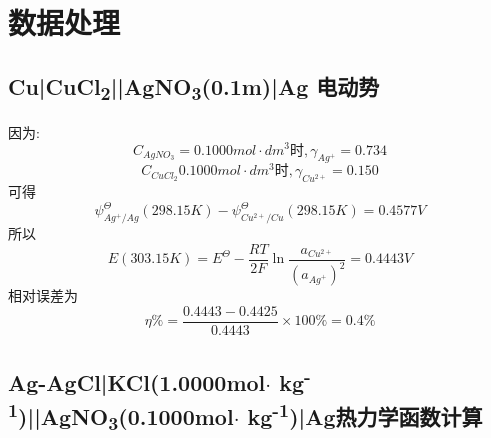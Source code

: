 \documentclass[11pt]{report}
\begin{document}
\chapter{数据处理}
\label{sec:org2010753}
\section{Cu|CuCl\textsubscript{2}||AgNO\textsubscript{3}(0.1m)|Ag 电动势}
\label{sec:org9f7a7e3}
因为:
\[
C_{AgNO_{3}}=0.1000mol\cdot dm^{3}时, \gamma_{Ag^{+}}=0.734
\]
\[
C_{CuCl_{2}}0.1000mol\cdot dm^{3}时, \gamma_{Cu^{2+}}=0.150
\]
可得
\[
\psi^{\Theta}_{Ag^{+}/Ag}(298.15K)-\psi^{\Theta}_{Cu^{2+}/Cu}(298.15K)=0.4577V
\]
所以
\[
E(303.15K)=E^{\Theta}-\frac{RT}{2F}\ln\frac{a_{Cu^{2+}}}{(a_{Ag^{+}})^2}=0.4443V
\]
相对误差为
\[
\eta \%= \frac{0.4443-0.4425}{0.4443}\times 100 \%= 0.4\%
\]
\section{Ag-AgCl|KCl(1.0000mol\(\cdot\) kg\textsuperscript{-1})||AgNO\textsubscript{3}(0.1000mol\(\cdot\) kg\textsuperscript{-1})|Ag热力学函数计算}
\label{sec:orge7ef241}
\end{document}
